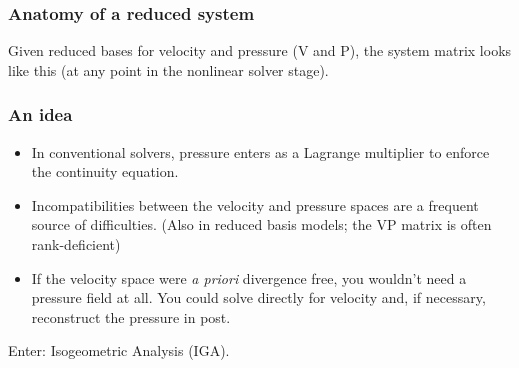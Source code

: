 \documentclass{beamer}
\begin{document}
\begin{frame}
  \frametitle{Anatomy of a reduced system}

  Given reduced bases for velocity and pressure (V and P), the system matrix looks like this
  (at any point in the nonlinear solver stage).

  \begin{center}
  \end{center}
\end{frame}

\begin{frame}
  \frametitle{An idea}

  \begin{itemize}
  \item In conventional solvers, pressure enters as a Lagrange multiplier to enforce the continuity
    equation.
  \item Incompatibilities between the velocity and pressure spaces are a frequent source of
    difficulties. (Also in reduced basis models; the VP matrix is often rank-deficient)
  \item If the velocity space were \emph{a priori} divergence free, you wouldn't need a pressure
    field at all. You could solve directly for velocity and, if necessary, reconstruct the pressure
    in post.
  \end{itemize}

  Enter: Isogeometric Analysis (IGA).
\end{frame}
\end{document}
